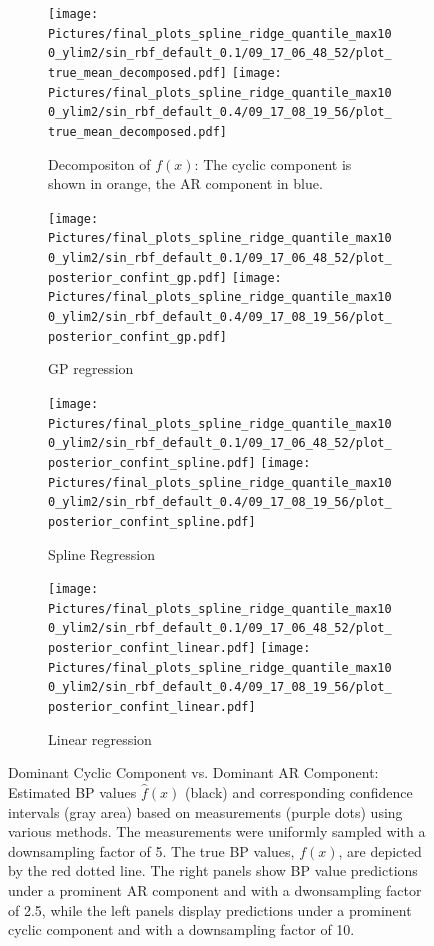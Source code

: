 \begin{figure}

\begin{subfigure}{\textwidth}
    \centering
    \texttt{[image: 
    Pictures/final\_plots\_spline\_ridge\_quantile\_max100\_ylim2/sin\_rbf\_default\_0.1/09\_17\_06\_48\_52/plot\_true\_mean\_decomposed.pdf]}
    \texttt{[image: 
    Pictures/final\_plots\_spline\_ridge\_quantile\_max100\_ylim2/sin\_rbf\_default\_0.4/09\_17\_08\_19\_56/plot\_true\_mean\_decomposed.pdf]}
  \caption{Decompositon of $f(x)$: The cyclic component is shown in orange, the AR component in blue.}
\end{subfigure}

\begin{subfigure}{\textwidth}
    \centering
    \texttt{[image: 
    Pictures/final\_plots\_spline\_ridge\_quantile\_max100\_ylim2/sin\_rbf\_default\_0.1/09\_17\_06\_48\_52/plot\_posterior\_confint\_gp.pdf]}
    \texttt{[image: 
        Pictures/final\_plots\_spline\_ridge\_quantile\_max100\_ylim2/sin\_rbf\_default\_0.4/09\_17\_08\_19\_56/plot\_posterior\_confint\_gp.pdf]}
  \caption{GP regression}
\end{subfigure}\hfill

\begin{subfigure}{\textwidth}
    \centering
    \texttt{[image: 
    Pictures/final\_plots\_spline\_ridge\_quantile\_max100\_ylim2/sin\_rbf\_default\_0.1/09\_17\_06\_48\_52/plot\_posterior\_confint\_spline.pdf]}
    \texttt{[image: 
        Pictures/final\_plots\_spline\_ridge\_quantile\_max100\_ylim2/sin\_rbf\_default\_0.4/09\_17\_08\_19\_56/plot\_posterior\_confint\_spline.pdf]}
  \caption{Spline Regression }
\end{subfigure}

\begin{subfigure}{\textwidth}
    \centering
    \texttt{[image: 
    Pictures/final\_plots\_spline\_ridge\_quantile\_max100\_ylim2/sin\_rbf\_default\_0.1/09\_17\_06\_48\_52/plot\_posterior\_confint\_linear.pdf]}
    \texttt{[image: 
        Pictures/final\_plots\_spline\_ridge\_quantile\_max100\_ylim2/sin\_rbf\_default\_0.4/09\_17\_08\_19\_56/plot\_posterior\_confint\_linear.pdf]}
  \caption{Linear regression }
\end{subfigure}


\caption[Dominant Cyclic Component vs. Dominant AR Component]{
Dominant Cyclic Component vs. Dominant AR Component:
    Estimated BP values $\hat{f}(x)$ (black) and corresponding confidence intervals (gray area)
    based on measurements (purple dots) using various methods.
    The measurements were uniformly sampled with a downsampling factor of 5.
    The true BP values, $f(x)$, are depicted by the red dotted line.
    The right panels show BP value predictions under a prominent AR component and with a dwonsampling factor of 2.5,
    while the left panels display predictions under a prominent cyclic component and with a downsampling factor of 10.
 }
\label{fig:ex-ar-cyclic}
\end{figure}



